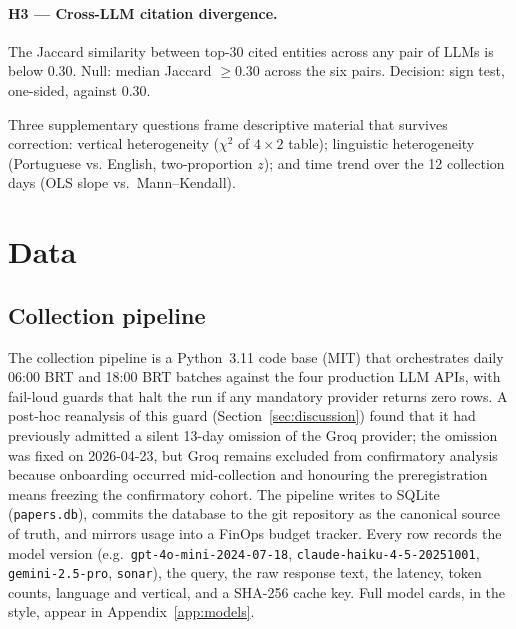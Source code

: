 \documentclass[preprint,12pt,authoryear]{elsarticle}
\begin{document}
\paragraph{H3 --- Cross-LLM citation divergence.} The Jaccard similarity between top-30 cited entities across any pair of LLMs is below 0.30. Null: median Jaccard $\geq 0.30$ across the six pairs. Decision: sign test, one-sided, against 0.30.

Three supplementary questions frame descriptive material that survives correction: vertical heterogeneity ($\chi^2$ of $4\times 2$ table); linguistic heterogeneity (Portuguese vs. English, two-proportion $z$); and time trend over the 12 collection days (OLS slope vs.\ Mann--Kendall).

\section{Data}\label{sec:data}

\subsection{Collection pipeline}
The collection pipeline is a Python~3.11 code base (MIT) that orchestrates daily 06:00 BRT and 18:00 BRT batches against the four production LLM APIs, with fail-loud guards that halt the run if any mandatory provider returns zero rows. A post-hoc reanalysis of this guard (Section~\ref{sec:discussion}) found that it had previously admitted a silent 13-day omission of the Groq provider; the omission was fixed on 2026-04-23, but Groq remains excluded from confirmatory analysis because onboarding occurred mid-collection and honouring the preregistration means freezing the confirmatory cohort. The pipeline writes to SQLite (\texttt{papers.db}), commits the database to the git repository as the canonical source of truth, and mirrors usage into a FinOps budget tracker. Every row records the model version (e.g.\ \texttt{gpt-4o-mini-2024-07-18}, \texttt{claude-haiku-4-5-20251001}, \texttt{gemini-2.5-pro}, \texttt{sonar}), the query, the raw response text, the latency, token counts, language and vertical, and a SHA-256 cache key. Full model cards, in the \citet{Mitchell2019} style, appear in Appendix~\ref{app:models}.
\end{document}
